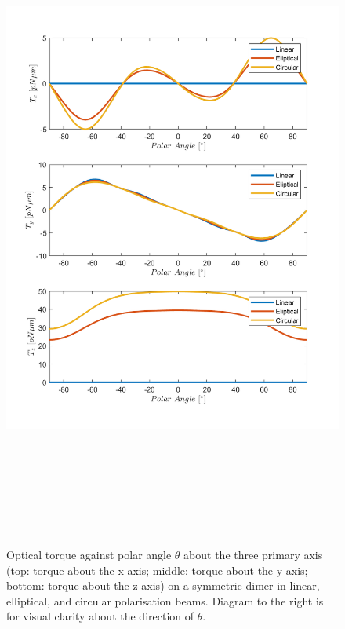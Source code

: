 \begin{figure}
	\includegraphics[width=0.7\linewidth,height= 22cm]{torque_different_polarisations.png}
	\caption{Optical torque against polar angle $\theta$ about the three primary axis (top: torque about the x-axis; middle: torque about the y-axis; bottom: torque about the z-axis) on a symmetric dimer in linear, elliptical, and circular polarisation beams. Diagram to the right is for visual clarity about the direction of $\theta$. \vspace{7.5cm}}
\end{figure}
\newpage

